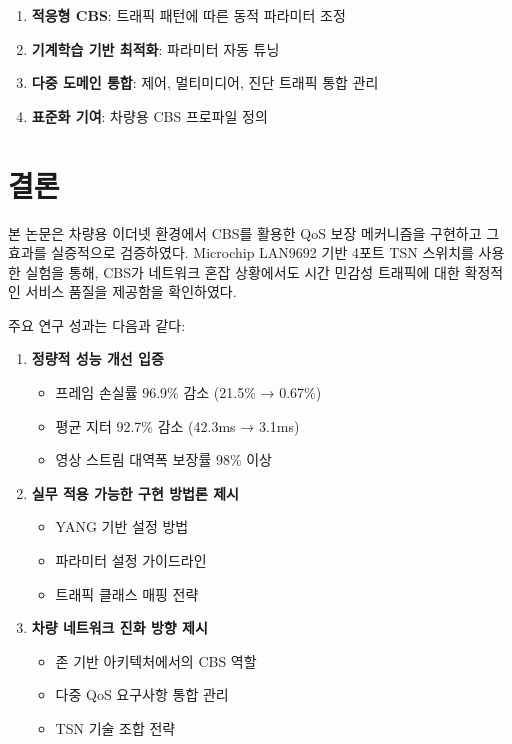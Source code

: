 \documentclass[10pt,twocolumn]{IEEEtran}
\begin{document}
\begin{enumerate}
\item \textbf{적응형 CBS}: 트래픽 패턴에 따른 동적 파라미터 조정
\item \textbf{기계학습 기반 최적화}: 파라미터 자동 튜닝
\item \textbf{다중 도메인 통합}: 제어, 멀티미디어, 진단 트래픽 통합 관리
\item \textbf{표준화 기여}: 차량용 CBS 프로파일 정의
\end{enumerate}

\section{결론}

본 논문은 차량용 이더넷 환경에서 CBS를 활용한 QoS 보장 메커니즘을 구현하고 그 효과를 실증적으로 검증하였다. Microchip LAN9692 기반 4포트 TSN 스위치를 사용한 실험을 통해, CBS가 네트워크 혼잡 상황에서도 시간 민감성 트래픽에 대한 확정적인 서비스 품질을 제공함을 확인하였다.

주요 연구 성과는 다음과 같다:

\begin{enumerate}
\item \textbf{정량적 성능 개선 입증}
   \begin{itemize}
   \item 프레임 손실률 96.9\% 감소 (21.5\% → 0.67\%)
   \item 평균 지터 92.7\% 감소 (42.3ms → 3.1ms)
   \item 영상 스트림 대역폭 보장률 98\% 이상
   \end{itemize}

\item \textbf{실무 적용 가능한 구현 방법론 제시}
   \begin{itemize}
   \item YANG 기반 설정 방법
   \item 파라미터 설정 가이드라인
   \item 트래픽 클래스 매핑 전략
   \end{itemize}

\item \textbf{차량 네트워크 진화 방향 제시}
   \begin{itemize}
   \item 존 기반 아키텍처에서의 CBS 역할
   \item 다중 QoS 요구사항 통합 관리
   \item TSN 기술 조합 전략
   \end{itemize}
\end{enumerate}
\end{document}
